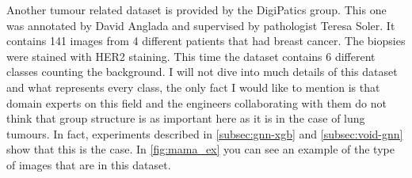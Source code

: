 Another tumour related dataset is provided by the DigiPatics group. This one was annotated by David Anglada and supervised by pathologist Teresa Soler. It contains 141 images from 4 different patients that had breast cancer. The biopsies were stained with HER2 staining. This time the dataset contains 6 different classes counting the background. I will not dive into much details of this dataset and what represents every class, the only fact I would like to mention is that domain experts on this field and the engineers collaborating with them do not think that group structure is as important here as it is in the case of lung tumours. In fact, experiments described in \autoref{subsec:gnn-xgb} and \autoref{subsec:void-gnn} show that this is the case. In \autoref{fig:mama_ex} you can see an example of the type of images that are in this dataset.

